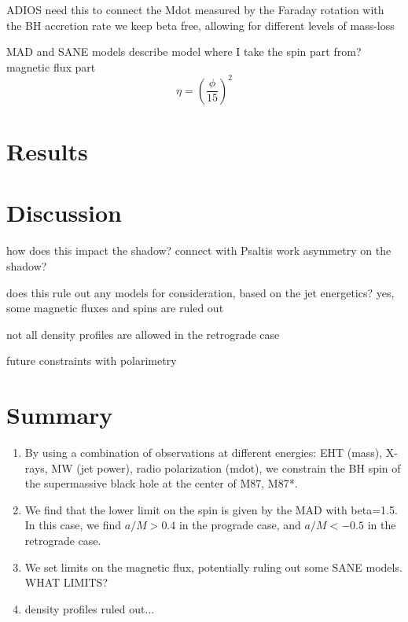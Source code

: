 \documentclass[preprint2]{aastex62}
\begin{document}
ADIOS \cite{Blandford1999}
need this to connect the Mdot measured by the Faraday rotation with the  BH accretion rate
we keep beta free, allowing for different levels of mass-loss

MAD and SANE models \cite{Narayan2003, Sasha2011, Narayan2012}
describe model
where I take the spin part from? \cite{Sasha2012a}
magnetic flux part
\begin{equation}
\eta = \left( \frac{\phi}{15} \right)^2 %
\end{equation}



\section{Results} 







\section{Discussion} \label{sec:disc}

how does this impact the shadow?
connect with Psaltis work
asymmetry on the shadow?

does this rule out any models for consideration, based on the jet energetics?
yes, some magnetic fluxes and spins are ruled out

not all density profiles are allowed in the retrograde case

future constraints with polarimetry




\section{Summary}	\label{sec:summary}

\begin{enumerate}
\item By using a combination of observations at different energies: EHT (mass), X-rays, MW (jet power), radio polarization (mdot), we constrain the BH spin of the supermassive black hole at the center of M87, M87*. 
\item We find that the lower limit on the spin is given by the MAD with beta=1.5. In this case, we find $a/M>0.4$ in the prograde case, and $a/M<-0.5$ in the retrograde case. 
\item We set limits on the magnetic flux, potentially ruling out some SANE models. WHAT LIMITS?
\item density profiles ruled out...
\end{enumerate}
\end{document}
